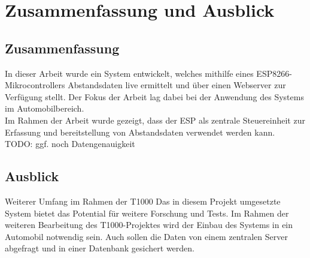 
\chapter{Zusammenfassung und Ausblick}
\section{Zusammenfassung}
In dieser Arbeit wurde ein System entwickelt, welches mithilfe eines ESP8266-Mikrocontrollers Abstandsdaten live ermittelt und über einen Webserver zur Verfügung stellt. Der Fokus der Arbeit lag dabei bei der Anwendung des Systems im Automobilbereich.\\
Im Rahmen der Arbeit wurde gezeigt, dass der ESP als zentrale Steuereinheit zur Erfassung und bereitstellung von Abstandsdaten verwendet werden kann.\\
TODO: ggf. noch Datengenauigkeit

\section{Ausblick}
Weiterer Umfang im Rahmen der T1000
Das in diesem Projekt umgesetzte System bietet das Potential für weitere Forschung und Tests. Im Rahmen der weiteren Bearbeitung des T1000-Projektes wird der Einbau des Systems in ein Automobil notwendig sein. Auch sollen die Daten von einem zentralen Server abgefragt und in einer Datenbank gesichert werden.